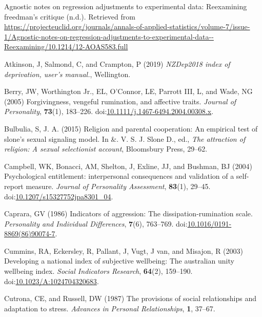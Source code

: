 \documentclass[
  singlecolumn,
  9pt]{scrartcl}
\newlength{\cslhangindent}
\newenvironment{CSLReferences}[2] %
 {\begin{list}{}{%
  \setlength{\itemindent}{0pt}
  \setlength{\leftmargin}{0pt}
  \setlength{\parsep}{0pt}
  \ifodd #1
   \setlength{\leftmargin}{\cslhangindent}
   \setlength{\itemindent}{-1\cslhangindent}
  \fi
  \setlength{\itemsep}{#2\baselineskip}}}
 {\end{list}}
\begin{document}
\label{refs}
\begin{CSLReferences}{1}{0}
Agnostic notes on regression adjustments to experimental data:
Reexamining freedman{'}s critique (n.d.). Retrieved from
\url{https://projecteuclid.org/journals/annals-of-applied-statistics/volume-7/issue-1/Agnostic-notes-on-regression-adjustments-to-experimental-data--Reexamining/10.1214/12-AOAS583.full}

Atkinson, J, Salmond, C, and Crampton, P (2019) \emph{NZDep2018 index of
deprivation, user{'}s manual.}, Wellington.

Berry, JW, Worthington Jr., EL, O'Connor, LE, Parrott III, L, and Wade,
NG (2005) Forgivingness, vengeful rumination, and affective traits.
\emph{Journal of Personality}, \textbf{73}(1), 183--226.
doi:\href{https://doi.org/10.1111/j.1467-6494.2004.00308.x}{10.1111/j.1467-6494.2004.00308.x}.

Bulbulia, S, J. A. (2015) Religion and parental cooperation: An
empirical test of slone's sexual signaling model. In \&. V. S. J. Slone
D., ed., \emph{The attraction of religion: A sexual selectionist
account}, Bloomsbury Press, 29--62.

Campbell, WK, Bonacci, AM, Shelton, J, Exline, JJ, and Bushman, BJ
(2004) Psychological entitlement: interpersonal consequences and
validation of a self-report measure. \emph{Journal of Personality
Assessment}, \textbf{83}(1), 29--45.
doi:\href{https://doi.org/10.1207/s15327752jpa8301_04}{10.1207/s15327752jpa8301\_04}.

Caprara, GV (1986) Indicators of aggression: The dissipation-rumination
scale. \emph{Personality and Individual Differences}, \textbf{7}(6),
763--769.
doi:\href{https://doi.org/10.1016/0191-8869(86)90074-7}{10.1016/0191-8869(86)90074-7}.

Cummins, RA, Eckersley, R, Pallant, J, Vugt, J van, and Misajon, R
(2003) Developing a national index of subjective wellbeing: The
australian unity wellbeing index. \emph{Social Indicators Research},
\textbf{64}(2), 159--190.
doi:\href{https://doi.org/10.1023/A:1024704320683}{10.1023/A:1024704320683}.

Cutrona, CE, and Russell, DW (1987) The provisions of social
relationships and adaptation to stress. \emph{Advances in Personal
Relationships}, \textbf{1}, 37--67.


\end{CSLReferences}
\end{document}
